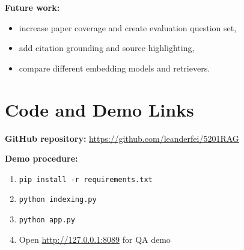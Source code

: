 \documentclass[11pt,a4paper]{article}
\begin{document}
\textbf{Future work:}
\begin{itemize}[leftmargin=1.4em]
  \item increase paper coverage and create evaluation question set,
  \item add citation grounding and source highlighting,
  \item compare different embedding models and retrievers.
\end{itemize}

\section{Code and Demo Links}
\textbf{GitHub repository:} \url{https://github.com/leanderfei/5201RAG}

\textbf{Demo procedure:}
\begin{enumerate}[leftmargin=1.4em]
  \item \texttt{pip install -r requirements.txt}
  \item \texttt{python indexing.py}
  \item \texttt{python app.py}
  \item Open \url{http://127.0.0.1:8089} for QA demo
\end{enumerate}
\end{document}
